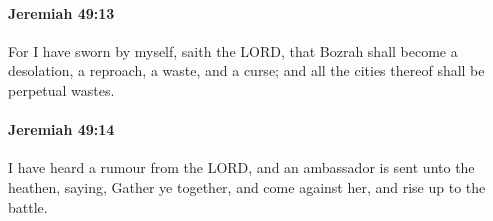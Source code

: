 		\paragraph{Jeremiah 49:13} %
			\label{JEREMIAH-49-13}

			For I have sworn by myself, saith the LORD, that Bozrah shall become a desolation, a reproach, a waste, and a curse; and all the cities thereof shall be perpetual wastes.


		\paragraph{Jeremiah 49:14} %
			\label{JEREMIAH-49-14}

			I have heard a rumour from the LORD, and an ambassador is sent unto the heathen, saying, Gather ye together, and come against her, and rise up to the battle.


